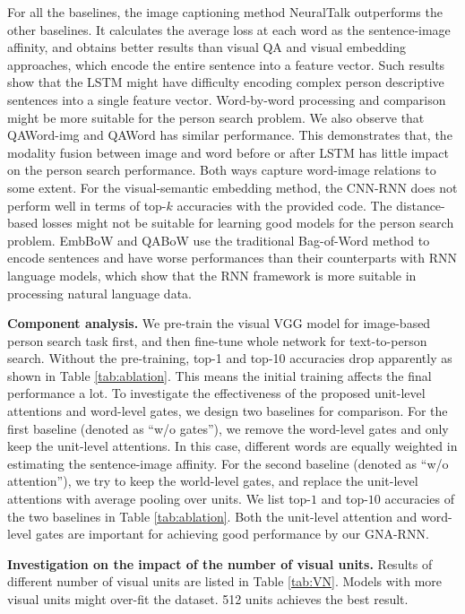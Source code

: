 For all the baselines, the image captioning method NeuralTalk outperforms the other baselines. It calculates the average loss at each word as the sentence-image affinity, and obtains better results than visual QA and visual embedding approaches, which encode the entire sentence into a feature vector.
Such results show that the LSTM might have difficulty encoding complex person descriptive sentences into a single feature vector. Word-by-word processing and comparison might be more suitable for the person search problem.
%
We also observe that QAWord-img and QAWord has similar performance. This demonstrates that, the modality fusion between image and word before or after LSTM has little impact on the person search performance. Both ways capture word-image relations to some extent. 
For the visual-semantic embedding method, the CNN-RNN does not perform well in terms of top-$k$ accuracies with the provided code. The distance-based losses might not be suitable for learning good models for the person search problem. EmbBoW and QABoW use the traditional Bag-of-Word method to encode sentences and have worse performances than their counterparts with RNN language models, which show that the RNN framework is more suitable in processing natural language data.

{\bf Component analysis.} 
We pre-train the visual VGG model for image-based person search task first, and then fine-tune whole network for text-to-person search. Without the pre-training, top-1 and top-10 accuracies drop apparently as shown in Table \ref{tab:ablation}. This means the initial training affects the final performance a lot.
To investigate the effectiveness of the proposed unit-level attentions and word-level gates, we design two baselines for comparison. For the first baseline (denoted as ``w/o gates''), we remove the word-level gates and only keep the unit-level attentions. In this case, different words are equally weighted in estimating the sentence-image affinity. For the second baseline (denoted as ``w/o attention''), we try to keep the world-level gates, and replace the unit-level attentions with average pooling over units.
We list top-$1$ and top-$10$ accuracies of the two baselines in Table \ref{tab:ablation}.
Both the unit-level attention and word-level gates are important for achieving good performance by our GNA-RNN.

{\bf Investigation on the impact of the number of visual units.} 
Results of different number of visual units are listed in Table \ref{tab:VN}. Models with more visual units might over-fit the dataset. 512 units achieves the best result.


